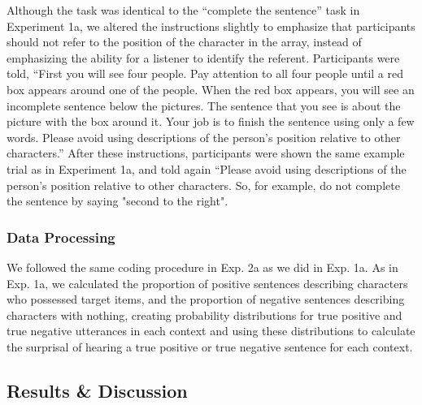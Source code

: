 \documentclass[man, floatsintext, noapacite]{apa6}
\begin{document}
Although the task was identical to the ``complete the sentence'' task in Experiment 1a, we altered the instructions slightly to emphasize that participants should not refer to the position of the character in the array, instead of emphasizing the ability for a listener to identify the referent. Participants were told, ``First you will see four people. Pay attention to all four people until a red box appears around one of the people. When the red box appears, you will see an incomplete sentence below the pictures. The sentence that you see is about the picture with the box around it. Your job is to finish the sentence using only a few words. Please avoid using descriptions of the person's position relative to other characters.'' After these instructions, participants were shown the same example trial as in Experiment 1a, and told again ``Please avoid using descriptions of the person's position relative to other characters. So, for example, do not complete the sentence by saying "second to the right".

\subsubsection{Data Processing} 

We followed the same coding procedure in Exp. 2a as we did in Exp. 1a. As in Exp. 1a, we calculated the proportion of positive sentences describing characters who possessed target items, and the proportion of negative sentences describing characters with nothing, creating probability distributions for true positive and true negative utterances in each context and using these distributions to calculate the surprisal of hearing a true positive or true negative sentence for each context. 


\subsection{Results \& Discussion}
\end{document}
